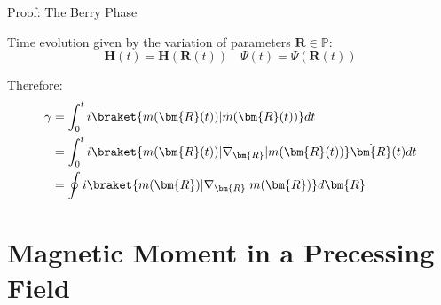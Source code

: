 \documentclass[9pt]{beamer}
\begin{document}
\begin{frame}{Proof: The Berry Phase}
  
  Time evolution given by the variation of parameters $\bm{R} \in \mathbb{P}$:
  \begin{equation*}
    \bm{H}(t) = \bm{H}(\bm{R}(t)) \quad \Psi(t) = \Psi(\bm{R}(t))
  \end{equation*}

  Therefore:
  \begin{align*}
    \gamma &=  \int_{0}^{t} i \braket{m(\bm{R}(t))|\dot{m}(\bm{R}(t))} dt\\
           &=  \int_{0}^{t}
           i \braket{m(\bm{R}(t))|\nabla_{\bm{R}}|m(\bm{R}(t))} \dot{\bm{R}}(t) dt \\
           &= \oint i \braket{m(\bm{R})|\nabla_{\bm{R}}|m(\bm{R})}d\bm{R}
  \end{align*}
\end{frame}


\section{Magnetic Moment in a Precessing Field}
\end{document}
